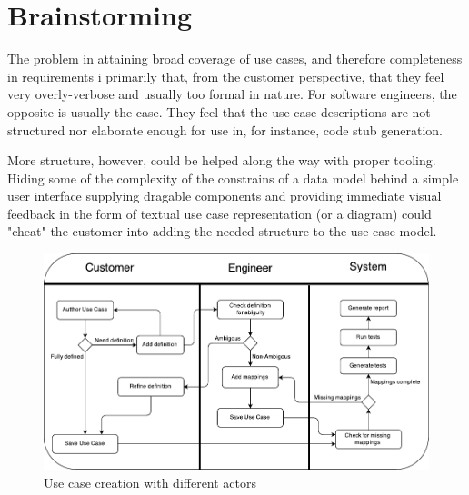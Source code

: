 
\section{Brainstorming}
The problem in attaining broad coverage of use cases, and therefore completeness in requirements i primarily that, from the customer perspective, that they feel very overly-verbose and usually too formal in nature. For software engineers, the opposite is usually the case. They feel that the use case descriptions are not structured nor elaborate enough for use in, for instance, code stub generation.

More structure, however, could be helped along the way with proper tooling. Hiding some of the complexity of the constrains of a data model behind a simple user interface supplying dragable components and providing immediate visual feedback in the form of textual use case representation (or a diagram) could "cheat" the customer into adding the needed structure to the use case model.

\begin{figure}[h]
\includegraphics[scale=0.9]{img/use_case_creation_activity_diagram}
\centering
\caption{Use case creation with different actors}
\label{fig:use_case_creation_activity_diagram}
\end{figure}

